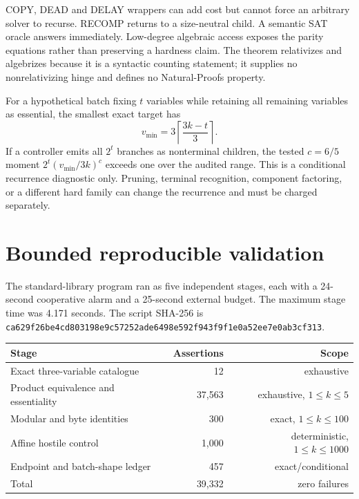 \documentclass[11pt]{article}
\begin{document}
COPY, DEAD and DELAY wrappers can add cost but cannot force an arbitrary
solver to recurse.  RECOMP returns to a size-neutral child.  A semantic SAT
oracle answers immediately.  Low-degree algebraic access exposes the parity
equations rather than preserving a hardness claim.  The theorem relativizes
and algebrizes because it is a syntactic counting statement; it supplies no
nonrelativizing hinge and defines no Natural-Proofs property.

For a hypothetical batch fixing $t$ variables while retaining all remaining
variables as essential, the smallest exact target has
\[
 v_{\min}=3\left\lceil\frac{3k-t}{3}\right\rceil.          \tag{10}
\]
If a controller emits all $2^t$ branches as nonterminal children, the tested
$c=6/5$ moment $2^t(v_{\min}/3k)^c$ exceeds one over the audited range.
This is a conditional recurrence diagnostic only.  Pruning, terminal
recognition, component factoring, or a different hard family can change the
recurrence and must be charged separately.

\section{Bounded reproducible validation}
The standard-library program
ran as five independent stages, each with a 24-second cooperative alarm and
a 25-second external budget.  The maximum stage time was 4.171 seconds.
The script SHA-256 is
\texttt{ca629f26be4cd803198e9c57252ade6498e592f943f9f1e0a52ee7e0ab3cf313}.

\begin{center}
\begin{tabular}{lrr}
\toprule
Stage & Assertions & Scope\\
\midrule
Exact three-variable catalogue & 12 & exhaustive\\
Product equivalence and essentiality & 37,563 & exhaustive, $1\le k\le5$\\
Modular and byte identities & 300 & exact, $1\le k\le100$\\
Affine hostile control & 1,000 & deterministic, $1\le k\le1000$\\
Endpoint and batch-shape ledger & 457 & exact/conditional\\
\midrule
Total & 39,332 & zero failures\\
\bottomrule
\end{tabular}
\end{center}
\end{document}
